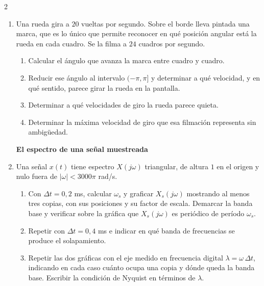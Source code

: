\documentclass[10pt,a4paper]{article}
\begin{document}
\begin{multicols}{2}
\begin{enumerate}
		\textbf{El problema del muestreo}

		\item Una rueda gira a $20$ vueltas por segundo. Sobre el borde lleva
		pintada una marca, que es lo único que permite reconocer en qué
		posición angular está la rueda en cada cuadro. Se la filma a $24$
		cuadros por segundo.
		\begin{enumerate}
			\item Calcular el ángulo que avanza la marca entre cuadro y cuadro.
			\item Reducir ese ángulo al intervalo $(-\pi,\pi]$ y determinar a
			qué velocidad, y en qué sentido, parece girar la rueda en la
			pantalla.
			\item Determinar a qué velocidades de giro la rueda parece quieta.
			\item Determinar la máxima velocidad de giro que esa filmación
			representa sin ambigüedad.
		\end{enumerate}

		\textbf{El espectro de una señal muestreada}

		\item Una señal $x(t)$ tiene espectro $X(j\omega)$ triangular, de altura
		$1$ en el origen y nulo fuera de $|\omega| < 3000\pi$ rad/s.
		\begin{enumerate}
			\item Con $\Delta t = 0{,}2$ ms, calcular $\omega_s$ y graficar
			$X_s(j\omega)$ mostrando al menos tres copias, con sus posiciones
			y su factor de escala. Demarcar la banda base y verificar sobre la
			gráfica que $X_s(j\omega)$ es periódico de período $\omega_s$.
			\item Repetir con $\Delta t = 0{,}4$ ms e indicar en qué banda de
			frecuencias se produce el solapamiento.
			\item Repetir las dos gráficas con el eje medido en frecuencia
			digital $\lambda = \omega\,\Delta t$, indicando en cada caso cuánto
			ocupa una copia y dónde queda la banda base. Escribir la condición
			de Nyquist en términos de $\lambda$.


\end{enumerate}
\end{enumerate}
\end{multicols}
\end{document}
